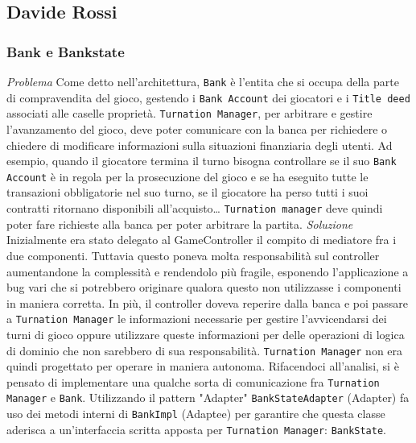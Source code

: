 \subsection{Davide Rossi}
\subsubsection{Bank e Bankstate}
\emph{Problema}\newline
Come detto nell'architettura, \texttt{Bank} è l'entita che si occupa della parte di compravendita del gioco, gestendo i \texttt{Bank Account} dei giocatori 
e i \texttt{Title deed} associati alle caselle proprietà.
\texttt{Turnation Manager}, per arbitrare e gestire l'avanzamento del gioco, deve poter comunicare con la banca per richiedere o chiedere di modificare 
informazioni sulla situazioni finanziaria degli utenti. Ad esempio, quando il giocatore termina il turno bisogna
controllare se il suo \texttt{Bank Account} è in regola per la prosecuzione del gioco e se ha eseguito tutte le transazioni
obbligatorie nel suo turno, se il giocatore ha perso tutti i suoi contratti ritornano disponibili all'acquisto\dots\newline
\texttt{Turnation manager} deve quindi poter fare richieste alla banca per poter arbitrare la partita.\newline
\emph{Soluzione}\newline
Inizialmente era stato delegato al GameController il compito di mediatore fra i due componenti. 
Tuttavia questo poneva molta responsabilità sul controller aumentandone la complessità e rendendolo più fragile, esponendo l'applicazione a bug vari
che si potrebbero originare qualora questo non utilizzasse i componenti in maniera corretta. 
In più, il controller doveva reperire dalla banca e poi passare a \texttt{Turnation Manager} le informazioni necessarie per gestire l'avvicendarsi 
dei turni di gioco oppure utilizzare queste informazioni per delle operazioni di logica di dominio che non sarebbero di sua responsabilità.\newline
\texttt{Turnation Manager} non era quindi progettato per operare in maniera autonoma. \newline
Rifacendoci all'analisi, si è pensato di implementare una qualche sorta di comunicazione fra \texttt{Turnation Manager} e \texttt{Bank}. Utilizzando il pattern "Adapter" 
\texttt{BankStateAdapter} (Adapter) fa uso dei metodi interni di \texttt{BankImpl} (Adaptee) per garantire che questa classe aderisca 
a un'interfaccia scritta apposta per \texttt{Turnation Manager}: \texttt{BankState}.
